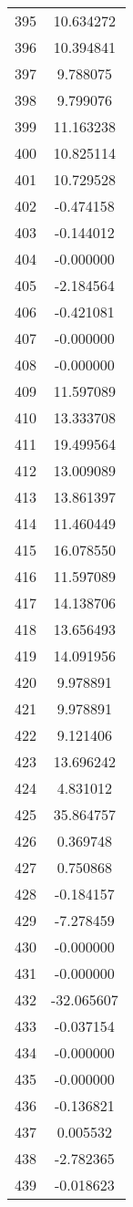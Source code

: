 \documentclass[12pt]{article}
\begin{document}
\begin{longtable}{@{}cc@{}}
395 & 10.634272 \\
396 & 10.394841 \\
397 & 9.788075 \\
398 & 9.799076 \\
399 & 11.163238 \\
400 & 10.825114 \\
401 & 10.729528 \\
402 & -0.474158 \\
403 & -0.144012 \\
404 & -0.000000 \\
405 & -2.184564 \\
406 & -0.421081 \\
407 & -0.000000 \\
408 & -0.000000 \\
409 & 11.597089 \\
410 & 13.333708 \\
411 & 19.499564 \\
412 & 13.009089 \\
413 & 13.861397 \\
414 & 11.460449 \\
415 & 16.078550 \\
416 & 11.597089 \\
417 & 14.138706 \\
418 & 13.656493 \\
419 & 14.091956 \\
420 & 9.978891 \\
421 & 9.978891 \\
422 & 9.121406 \\
423 & 13.696242 \\
424 & 4.831012 \\
425 & 35.864757 \\
426 & 0.369748 \\
427 & 0.750868 \\
428 & -0.184157 \\
429 & -7.278459 \\
430 & -0.000000 \\
431 & -0.000000 \\
432 & -32.065607 \\
433 & -0.037154 \\
434 & -0.000000 \\
435 & -0.000000 \\
436 & -0.136821 \\
437 & 0.005532 \\
438 & -2.782365 \\
439 & -0.018623 \\

\end{longtable}
\end{document}
